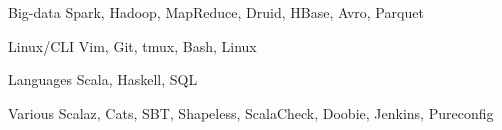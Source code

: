 

\begin{cvskills}

  \cvskill
    {Big-data}
    {Spark, Hadoop, MapReduce, Druid, HBase, Avro, Parquet}

  \cvskill
    {Linux/CLI}
    {Vim, Git, tmux, Bash, Linux}

  \cvskill
    {Languages}
    {Scala, Haskell, SQL}

  \cvskill
    {Various}
    {Scalaz, Cats, SBT, Shapeless, ScalaCheck, Doobie, Jenkins, Pureconfig}

\end{cvskills}

